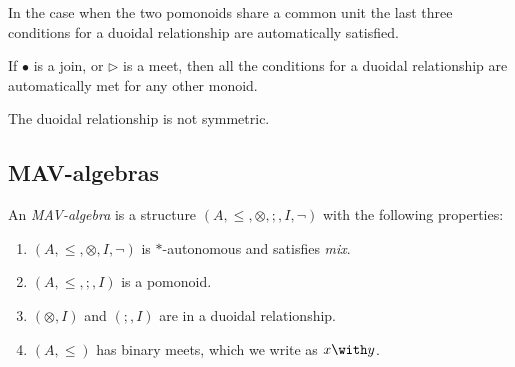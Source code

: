 \begin{remark}
  In the case when the two pomonoids share a common unit the last
  three conditions for a duoidal relationship are automatically
  satisfied.
\end{remark}

\begin{remark}
  If $\bullet$ is a join, or $\rhd$ is a meet, then all the conditions
  for a duoidal relationship are automatically met for any other
  monoid. 
\end{remark}

\begin{remark}
  The duoidal relationship is not symmetric.
\end{remark}

\subsection{MAV-algebras}

\begin{definition}
  An \emph{MAV-algebra} is a structure
  $(A, \leq, \otimes, ;, I, \lnot)$ with the following properties:
  \begin{enumerate}
  \item $(A, \leq, \otimes, I, \lnot)$ is $*$-autonomous and satisfies \emph{mix}.
  \item $(A, \leq, ;, I)$ is a pomonoid.
  \item $(\otimes, I)$ and $(;, I)$ are in a duoidal relationship.
  \item $(A, \leq)$ has binary meets, which we write as $x \with y$.
  \end{enumerate}
\end{definition}


